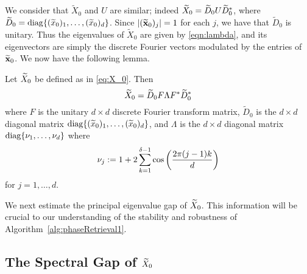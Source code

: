 We consider that $\widetilde{X}_0$ and $U$ are similar; indeed $\widetilde{X}_0 = \widetilde{D}_0 U \widetilde{D}_0^*$, where $\widetilde{D}_0 = \mathrm{diag}\{(\widetilde{x}_0)_1, \ldots, (\widetilde{x}_0)_d\}$.  Since $|(\widetilde{\mathbf x}_0)_j| = 1$ for each $j$, we have that $\widetilde{D}_0$ is unitary.  Thus the eigenvalues of $\widetilde{X}_0$ are given by \eqref{eqn:lambda}, and its eigenvectors are simply the discrete Fourier vectors modulated by the entries of $\widetilde{\mathbf x}_0$.  %
We now have the following lemma.

\begin{lemma}
Let $\widetilde{X}_0$ be defined as in \eqref{eq:X_0}.  Then $$\widetilde{X}_0 = \widetilde{D}_0 F \Lambda F^* \widetilde{D}_0^*$$ where $F$ is the unitary $d \times d$ discrete Fourier transform matrix, $\widetilde{D}_0$ is the $d \times d$ diagonal matrix $\mathrm{diag}\{(\widetilde{x}_0)_1, \ldots, (\widetilde{x}_0)_d\}$, and $\Lambda$ is the $d \times d$ diagonal matrix $\mathrm{diag}\{\nu_1, \ldots, \nu_{d}\}$ where
$$\nu_j := 1 + 2 \sum_{k = 1}^{\delta - 1}\cos\left(\frac{\displaystyle 2\pi (j-1) k}{\displaystyle d}\right)$$
for $j = 1, \dots, d$.
\label{lem:spectrum}
\end{lemma}

We next estimate the principal eigenvalue gap of $\widetilde{X}_0$.  This information will be crucial to our understanding of the stability and robustness of Algorithm~\ref{alg:phaseRetrieval1}.  

\subsection{The Spectral Gap of $\widetilde{X}_0$}

